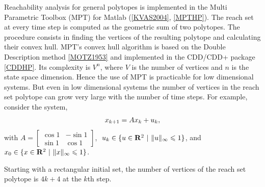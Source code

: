 \documentclass[letterpaper,10pt,english]{sphinxmanual}
\begin{document}
Reachability analysis for general polytopes is implemented in the Multi
Parametric Toolbox (MPT) for Matlab ({\hyperref[chap_implement:kvas2004]{{[}KVAS2004{]}}}, {\hyperref[chap_install:mpthp]{{[}MPTHP{]}}}). The reach set at every time step
is computed as the geometric sum of two polytopes. The procedure
consists in finding the vertices of the resulting polytope and
calculating their convex hull. MPT’s convex hull algorithm is based on
the Double Description method {\hyperref[chap_intro:motz1953]{{[}MOTZ1953{]}}} and implemented in
the CDD/CDD+ package {\hyperref[chap_intro:cddhp]{{[}CDDHP{]}}}. Its complexity is
\(V^n\), where \(V\) is the number of vertices and \(n\) is
the state space dimension. Hence the use of MPT is practicable for low
dimensional systems. But even in low dimensional systems the number of
vertices in the reach set polytope can grow very large with the number
of time steps. For example, consider the system,
\begin{gather}
\begin{split}x_{k+1} = Ax_k + u_k ,\end{split}\notag
\end{gather}
with \(A=\left[\begin{array}{cc}\cos 1 & -\sin 1\\ \sin 1 & \cos 1\end{array}\right]\),
\(\ u_k \in \{u\in {\bf R}^2 ~|~ \|u\|_{\infty}\leqslant1\}\),
and \(x_0 \in \{x\in {\bf R}^2 ~|~ \|x\|_{\infty}\leqslant1\}\).

Starting with a rectangular initial set, the number of vertices of the
reach set polytope is \(4k + 4\) at the \(k\)th step.
\end{document}
